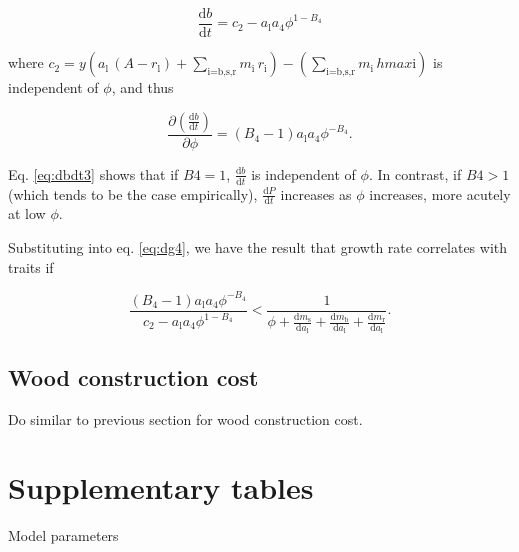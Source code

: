 \documentclass[12pt, a4paper]{article}
\begin{document}
\begin{appendices}
\begin{equation}\label{eq:dbdt2}
\frac{\textrm{d}b}{\textrm{d}t} = c_2 - a_\textrm{l} a_4 \phi ^{1-B_4}
\end{equation}

where
$c_2 = y ( a_\textrm{l} \, (A - r_\textrm{l}) + \sum_\textrm{i=b,s,r}{m_\textrm{i} \, r_\textrm{i}}) - (\sum_\textrm{i=b,s,r}{m_\textrm{i} \, hmax\textrm{i}})$
is independent of $\phi$, and thus

\begin{equation}\label{eq:dbdt3}
\frac{\partial \left( \frac{ \textrm{d}b} {\textrm{d}t}\right)}{\partial \phi}  =
(B_4-1) a_\textrm{l} a_4\phi ^{-B_4}.
\end{equation}

Eq. \ref{eq:dbdt3} shows that if $B4=1$, $\frac{ \textrm{d}b} {\textrm{d}t}$ is independent
of $\phi$. In contrast, if $B4>1$ (which tends to be the case empirically), $\frac{ \textrm
{d}P} {\textrm{d}t}$ increases as $\phi$ increases, more acutely at low $\phi$.

Substituting into eq. \ref{eq:dg4}, we have the result that growth rate correlates
with traits if

\begin{equation} \label{eq:G6}
\frac{(B_4-1) a_\textrm{l} a_4\phi ^{-B_4}}{c_2 - a_\textrm{l} a_4 \phi ^{1-B_4}}
< \frac{1}{\phi
 + \frac{\textrm{d}m_\textrm{s}}{\textrm{d}a_\textrm{l}} + \frac{\textrm{d}m_\textrm
 {b}}{\textrm{d}a_\textrm{l}} + \frac{\textrm{d}m_\textrm{r}}{\textrm{d}a_\textrm{l}}}.
\end{equation}

\subsection{Wood construction cost}

Do similar to previous section for wood construction cost.

\newpage

\section{Supplementary tables}\label{supplementary-tables}

\begin{table}[ht]
\caption{Model parameters}
\centering
{\footnotesize  %
\begin{doublespace}
% 

\end{doublespace}
}
\label{tab:params}
\end{table}


\end{appendices}
\end{document}
